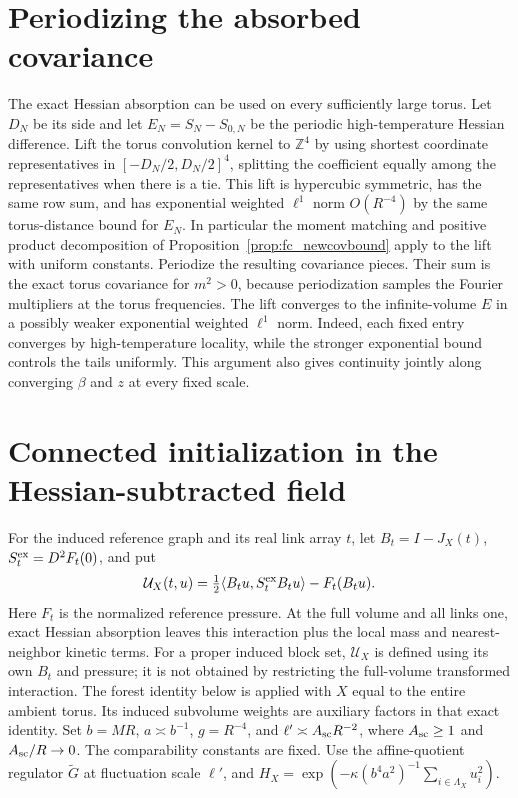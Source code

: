 \documentclass[11pt]{article}
\begin{document}
\section{Periodizing the absorbed covariance}\label{sec:box-periodization}

The exact Hessian absorption can be used on every sufficiently large
torus. Let \(D_N\) be its side and let \(E_N=S_N-S_{0,N}\) be the
periodic high-temperature Hessian difference. Lift the torus convolution
kernel to \(\mathbb Z^4\) by using shortest coordinate representatives
in \([-D_N/2,D_N/2]^4\), splitting the coefficient equally among the
representatives when there is a tie. This lift is hypercubic symmetric,
has the same row sum, and has exponential weighted \(\ell^1\) norm
\(O(R^{-4})\) by the same torus-distance bound for \(E_N\). In
particular the moment matching and positive product decomposition
of Proposition~\ref{prop:fc_newcovbound} apply to the lift with
uniform constants. Periodize the resulting covariance pieces.
Their sum is the exact torus covariance for \(m^2>0\), because
periodization samples the Fourier multipliers at the torus
frequencies. The lift converges to the infinite-volume \(E\) in
a possibly weaker exponential weighted \(\ell^1\) norm. Indeed,
each fixed entry converges by high-temperature locality, while
the stronger exponential bound controls the tails uniformly.
This argument also gives continuity jointly along converging
\(\beta\) and \(z\) at every fixed scale.
\section{Connected initialization in the Hessian-subtracted field}

For the induced reference graph and its real link array \(t\), let
\(B_t=I-J_X(t)\), \(S_t^{\rm ex}=D^2F_t(0)\), and put
\[
 \mathcal U_X(t,u)=\tfrac12\langle B_tu,S_t^{\rm ex}B_tu\rangle
                         -F_t(B_tu).
\]
Here \(F_t\) is the normalized reference pressure. At the full
volume and all links one, exact Hessian absorption leaves this
interaction plus the local mass and nearest-neighbor kinetic terms.
For a proper induced block set, \(\mathcal U_X\) is defined using
its own \(B_t\) and pressure; it is not obtained by restricting the
full-volume transformed interaction. The forest identity below is
applied with \(X\) equal to the entire ambient torus. Its induced
subvolume weights are auxiliary factors in that exact identity.
Set \(b=MR\), \(a\asymp b^{-1}\), \(g=R^{-4}\), and
\(\ell'\asymp A_{\rm sc} R^{-2}\), where \(A_{\rm sc}\ge1\) and \(A_{\rm sc}/R\to0\).
The comparability constants are fixed. Use the affine-quotient
regulator \(\widetilde G\) at fluctuation scale \(\ell'\), and
\(H_X=\exp(-\kappa(b^4a^2)^{-1}\sum_{i\in\Lambda_X}u_i^2)\).
\end{document}
